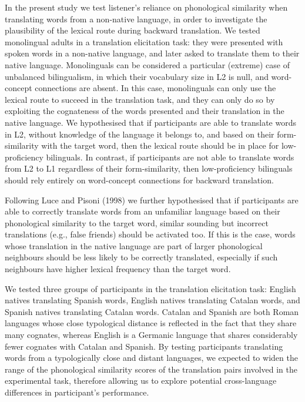 \documentclass[
  english,
  man,floatsintext]{apa6}
\begin{document}
In the present study we test listener's reliance on phonological similarity when translating words from a non-native language, in order to investigate the plausibility of the lexical route during backward translation. We tested monolingual adults in a translation elicitation task: they were presented with spoken words in a non-native language, and later asked to translate them to their native language. Monolinguals can be considered a particular (extreme) case of unbalanced bilingualism, in which their vocabulary size in L2 is null, and word-concept connections are absent. In this case, monolinguals can only use the lexical route to succeed in the translation task, and they can only do so by exploiting the cognateness of the words presented and their translation in the native language. We hypothesised that if participants are able to translate words in L2, without knowledge of the language it belongs to, and based on their form-similarity with the target word, then the lexical route should be in place for low-proficiency bilinguals. In contrast, if participants are not able to translate words from L2 to L1 regardless of their form-similarity, then low-proficiency bilinguals should rely entirely on word-concept connections for backward translation.

Following Luce and Pisoni (1998) we further hypothesised that if participants are able to correctly translate words from an unfamiliar language based on their phonological similarity to the target word, similar sounding but incorrect translations (e.g., false friends) should be activated too. If this is the case, words whose translation in the native language are part of larger phonological neighbours should be less likely to be correctly translated, especially if such neighbours have higher lexical frequency than the target word.

We tested three groups of participants in the translation elicitation task: English natives translating Spanish words, English natives translating Catalan words, and Spanish natives translating Catalan words. Catalan and Spanish are both Roman languages whose close typological distance is reflected in the fact that they share many cognates, whereas English is a Germanic language that shares considerably fewer cognates with Catalan and Spanish. By testing participants translating words from a typologically close and distant languages, we expected to widen the range of the phonological similarity scores of the translation pairs involved in the experimental task, therefore allowing us to explore potential cross-language differences in participant's performance.
\end{document}
